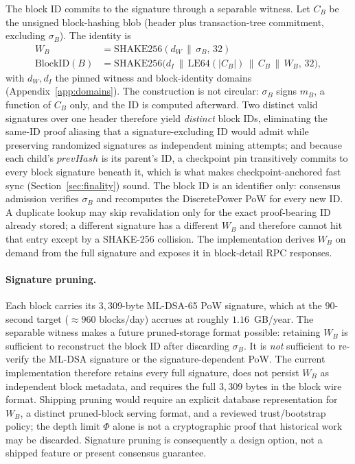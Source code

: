 \documentclass[11pt,a4paper]{article}
\newcommand{\concat}{\,\|\,}
\begin{document}
The block ID commits to the signature through a separable witness. Let
$C_B$ be the unsigned block-hashing blob (header plus transaction-tree
commitment, excluding $\sigma_B$). The identity is
\begin{align}
W_B &= \mathrm{SHAKE256}(d_W \concat \sigma_B,\, 32) \\
\mathrm{BlockID}(B) &= \mathrm{SHAKE256}\bigl(d_I \concat \mathrm{LE64}(|C_B|)
  \concat C_B \concat W_B,\, 32\bigr),
\end{align}
with $d_W,d_I$ the pinned witness and block-identity domains
(Appendix~\ref{app:domains}). The construction is not circular: $\sigma_B$
signs $m_B$, a function of $C_B$ only, and the ID is computed afterward. Two
distinct valid signatures over one header therefore yield \emph{distinct} block
IDs, eliminating the same-ID proof aliasing that a signature-excluding ID would
admit while preserving randomized signatures as independent mining attempts;
and because each child's $\mathit{prevHash}$ is its parent's ID, a
checkpoint pin transitively commits to every block signature beneath it, which
is what makes checkpoint-anchored fast sync (Section~\ref{sec:finality}) sound.
The block ID is an identifier only: consensus admission verifies $\sigma_B$ and
recomputes the DiscretePower PoW for every new ID. A duplicate lookup may skip
revalidation only for the exact proof-bearing ID already stored; a different
signature has a different $W_B$ and therefore cannot hit that entry except by a
SHAKE-256 collision. The implementation derives $W_B$ on demand from the full
signature and exposes it in block-detail RPC responses.

\paragraph{Signature pruning.}
Each block carries its $3{,}309$-byte ML-DSA-65 PoW signature, which at the
$90$-second target ($\approx 960$ blocks/day) accrues at roughly
$1.16$~GB/year. The separable witness makes a future pruned-storage format
possible: retaining $W_B$ is sufficient to reconstruct the block ID after
discarding $\sigma_B$. It is \emph{not} sufficient to re-verify the ML-DSA
signature or the signature-dependent PoW. The current implementation therefore
retains every full signature, does not persist $W_B$ as independent block
metadata, and requires the full $3{,}309$ bytes in the block wire format.
Shipping pruning would require an explicit database representation for $W_B$,
a distinct pruned-block serving format, and a reviewed trust/bootstrap policy;
the depth limit $\Phi$ alone is not a cryptographic proof that historical work
may be discarded. Signature pruning is consequently a design option, not a
shipped feature or present consensus guarantee.
\end{document}
